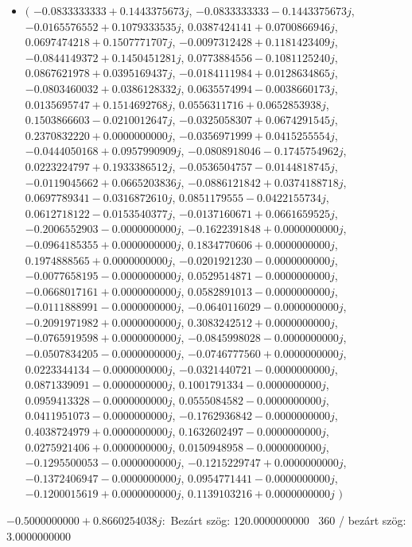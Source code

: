 \documentclass[14pt,a4paper]{article}
\begin{document}
\begin{itemize}
\item
$\big($
$-0.0833333333+0.1443375673j$, $-0.0833333333-0.1443375673j$, $-0.0165576552+0.1079333535j$, $0.0387424141+0.0700866946j$, $0.0697474218+0.1507771707j$, $-0.0097312428+0.1181423409j$, $-0.0844149372+0.1450451281j$, $0.0773884556-0.1081125240j$, $0.0867621978+0.0395169437j$, $-0.0184111984+0.0128634865j$, $-0.0803460032+0.0386128332j$, $0.0635574994-0.0038660173j$, $0.0135695747+0.1514692768j$, $0.0556311716+0.0652853938j$, $0.1503866603-0.0210012647j$, $-0.0325058307+0.0674291545j$, $0.2370832220+0.0000000000j$, $-0.0356971999+0.0415255554j$, $-0.0444050168+0.0957990909j$, $-0.0808918046-0.1745754962j$, $0.0223224797+0.1933386512j$, $-0.0536504757-0.0144818745j$, $-0.0119045662+0.0665203836j$, $-0.0886121842+0.0374188718j$, $0.0697789341-0.0316872610j$, $0.0851179555-0.0422155734j$, $0.0612718122-0.0153540377j$, $-0.0137160671+0.0661659525j$, $-0.2006552903-0.0000000000j$, $-0.1622391848+0.0000000000j$, $-0.0964185355+0.0000000000j$, $0.1834770606+0.0000000000j$, $0.1974888565+0.0000000000j$, $-0.0201921230-0.0000000000j$, $-0.0077658195-0.0000000000j$, $0.0529514871-0.0000000000j$, $-0.0668017161+0.0000000000j$, $0.0582891013-0.0000000000j$, $-0.0111888991-0.0000000000j$, $-0.0640116029-0.0000000000j$, $-0.2091971982+0.0000000000j$, $0.3083242512+0.0000000000j$, $-0.0765919598+0.0000000000j$, $-0.0845998028-0.0000000000j$, $-0.0507834205-0.0000000000j$, $-0.0746777560+0.0000000000j$, $0.0223344134-0.0000000000j$, $-0.0321440721-0.0000000000j$, $0.0871339091-0.0000000000j$, $0.1001791334-0.0000000000j$, $0.0959413328-0.0000000000j$, $0.0555084582-0.0000000000j$, $0.0411951073-0.0000000000j$, $-0.1762936842-0.0000000000j$, $0.4038724979+0.0000000000j$, $0.1632602497-0.0000000000j$, $0.0275921406+0.0000000000j$, $0.0150948958-0.0000000000j$, $-0.1295500053-0.0000000000j$, $-0.1215229747+0.0000000000j$, $-0.1372406947-0.0000000000j$, $0.0954771441-0.0000000000j$, $-0.1200015619+0.0000000000j$, $0.1139103216+0.0000000000j$
$\big)$
\end{itemize}
$-0.5000000000+0.8660254038j$:\
Bezárt szög: $120.0000000000$ \
360 / bezárt szög: $3.0000000000$\
\end{document}

